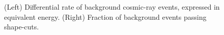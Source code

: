 \begin{figure}[ht]
%
\caption{\label{FIG::VERITAS::CR} (Left) Differential rate of background 
cosmic-ray events, expressed in equivalent \Gray energy. (Right)
Fraction of background events passing shape-cuts.}
\end{figure}

